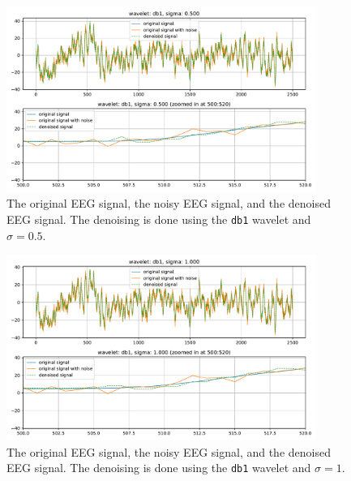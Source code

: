 \begin{figure}[H]
    \label{fig:problem3b_plot2}
    \centering
    \includegraphics[width=0.9\textwidth]{./img/problem3-denoised-signal-wavelet-db1-sigma-0.500.pdf}
    \caption{The original EEG signal, the noisy EEG signal, and the denoised EEG signal. The denoising is done using the \texttt{db1} wavelet and $\sigma = 0.5$.}
\end{figure}


\begin{figure}[H]
    \label{fig:problem3b_plot3}
    \centering
    \includegraphics[width=0.9\textwidth]{./img/problem3-denoised-signal-wavelet-db1-sigma-1.000.pdf}
    \caption{The original EEG signal, the noisy EEG signal, and the denoised EEG signal. The denoising is done using the \texttt{db1} wavelet and $\sigma = 1$.}
\end{figure}

